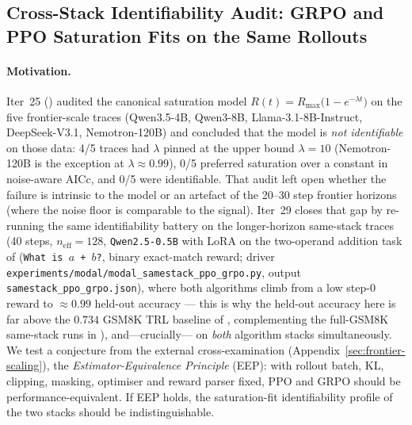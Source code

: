 \subsection{Cross-Stack Identifiability Audit: GRPO and PPO Saturation Fits on the Same Rollouts}
\label{sec:scaling-law-iter29}

\paragraph{Motivation.}
Iter~25 () audited the canonical saturation model
$R(t)=R_{\max}\bigl(1-e^{-\lambda t}\bigr)$ on the five frontier-scale
traces (Qwen3.5-4B, Qwen3-8B, Llama-3.1-8B-Instruct, DeepSeek-V3.1,
Nemotron-120B) and concluded that the model is \emph{not identifiable}
on those data: 4/5 traces had $\lambda$ pinned at the upper bound
$\lambda=10$ (Nemotron-120B is the exception at $\lambda\!\approx\!0.99$),
0/5 preferred saturation over a constant in noise-aware
AICc, and 0/5 were identifiable.
That audit left open whether the failure is intrinsic to the model or
an artefact of the 20--30 step frontier horizons (where the noise floor
is comparable to the signal). Iter~29 closes that gap by re-running the
same identifiability battery on the longer-horizon same-stack traces
(40 steps, $n_{\mathrm{eff}}=128$, \texttt{Qwen2.5-0.5B} with LoRA on the two-operand addition task of
 (\texttt{What is $a$ + $b$?}, binary exact-match
reward; driver \texttt{experiments/modal/modal\_samestack\_ppo\_grpo.py},
output \texttt{samestack\_ppo\_grpo.json}), where both algorithms climb
from a low step-0 reward to $\approx 0.99$ held-out accuracy --- this is
why the held-out accuracy here is far above the $0.734$ GSM8K TRL
baseline of , complementing the full-GSM8K
same-stack runs in ), and---crucially---
on \emph{both} algorithm stacks simultaneously. We test a conjecture from the external cross-examination
(Appendix~\ref{sec:frontier-scaling}), the \emph{Estimator-Equivalence
Principle} (EEP): with
rollout batch, KL, clipping, masking, optimiser and reward parser fixed,
PPO and GRPO should be performance-equivalent. If EEP holds, the
saturation-fit identifiability profile of the two stacks should be
indistinguishable.

